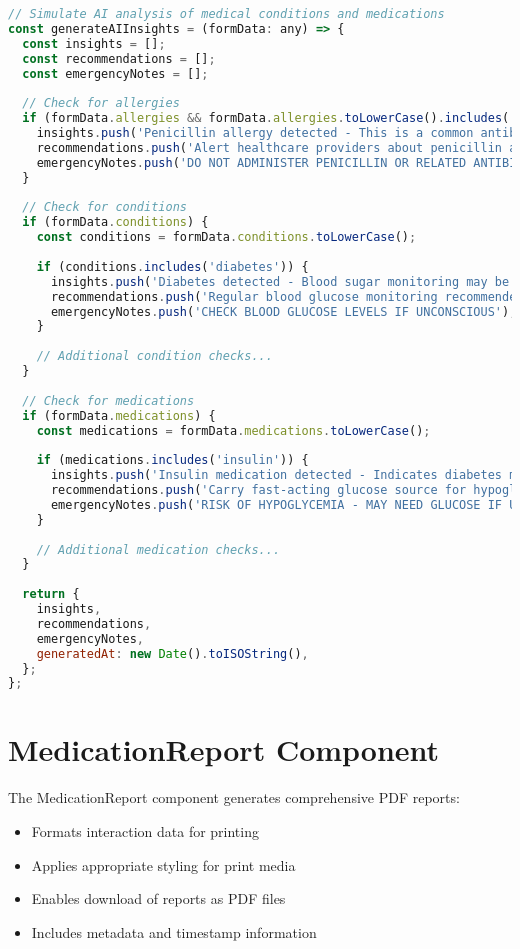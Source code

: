 \documentclass[12pt,a4paper]{report}
\begin{document}
\begin{lstlisting}[language=JavaScript, caption=AI Health Analysis]
// Simulate AI analysis of medical conditions and medications
const generateAIInsights = (formData: any) => {
  const insights = [];
  const recommendations = [];
  const emergencyNotes = [];
  
  // Check for allergies
  if (formData.allergies && formData.allergies.toLowerCase().includes('penicillin')) {
    insights.push('Penicillin allergy detected - This is a common antibiotic allergy');
    recommendations.push('Alert healthcare providers about penicillin allergy before any treatment');
    emergencyNotes.push('DO NOT ADMINISTER PENICILLIN OR RELATED ANTIBIOTICS');
  }
  
  // Check for conditions
  if (formData.conditions) {
    const conditions = formData.conditions.toLowerCase();
    
    if (conditions.includes('diabetes')) {
      insights.push('Diabetes detected - Blood sugar monitoring may be necessary');
      recommendations.push('Regular blood glucose monitoring recommended');
      emergencyNotes.push('CHECK BLOOD GLUCOSE LEVELS IF UNCONSCIOUS');
    }
    
    // Additional condition checks...
  }
  
  // Check for medications
  if (formData.medications) {
    const medications = formData.medications.toLowerCase();
    
    if (medications.includes('insulin')) {
      insights.push('Insulin medication detected - Indicates diabetes management');
      recommendations.push('Carry fast-acting glucose source for hypoglycemia');
      emergencyNotes.push('RISK OF HYPOGLYCEMIA - MAY NEED GLUCOSE IF UNCONSCIOUS');
    }
    
    // Additional medication checks...
  }
  
  return {
    insights,
    recommendations,
    emergencyNotes,
    generatedAt: new Date().toISOString(),
  };
};
\end{lstlisting}

\section{MedicationReport Component}
The MedicationReport component generates comprehensive PDF reports:
\begin{itemize}
    \item Formats interaction data for printing
    \item Applies appropriate styling for print media
    \item Enables download of reports as PDF files
    \item Includes metadata and timestamp information
\end{itemize}
\end{document}
